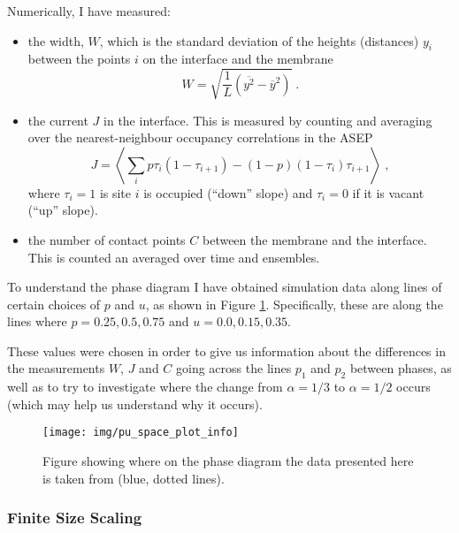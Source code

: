 \documentclass[a4paper,10pt]{article}
\newcommand{\fref}[1]{Figure \ref{#1}}
\begin{document}
Numerically, I have measured:
\begin{itemize}
 
 \item the width, $W$, which is the standard deviation of the heights (distances) $y_i$ between the points $i$ on the interface and the membrane
  \begin{equation}
   W = \sqrt{ \frac{1}{L} \left( \overline{y^2} - \overline{y}^2 \right) } \;. 
  \end{equation}
 
 \item the current $J$ in the interface. This is measured by counting and averaging over the nearest-neighbour occupancy correlations in the ASEP
 \begin{equation}
  J = \left\langle \sum_i p \tau_i(1-\tau_{i+1} ) - (1-p)(1-\tau_i)\tau_{i+1} \right\rangle \;,
 \end{equation}
 where $\tau_i = 1$ is site $i$ is occupied (``down'' slope) and $\tau_i=0$ if it is vacant (``up'' slope).
 
 \item the number of contact points $C$ between the membrane and the interface. This is counted an averaged over time and ensembles. 

\end{itemize}

To understand the phase diagram I have obtained simulation data along lines of certain choices of $p$ and $u$, as shown in \fref{fig:pu_space_plot_info}. Specifically, these are along the lines where $p=0.25, 0.5, 0.75$ and $u = 0.0, 0.15, 0.35$.

These values were chosen in order to give us information about the differences in the measurements $W$, $J$ and $C$ going across the lines $p_1$ and $p_2$ between phases, as well as to try to investigate where the change from $\alpha = 1/3$ to $\alpha = 1/2$ occurs (which may help us understand why it occurs).

\begin{figure}[bh]
 \centering
 \texttt{[image: img/pu\_space\_plot\_info]}
 \label{fig:pu_space_plot_info}
 \caption{Figure showing where on the phase diagram the data presented here is taken from (blue, dotted lines).}
\end{figure}

\subsubsection{Finite Size Scaling}
\end{document}
